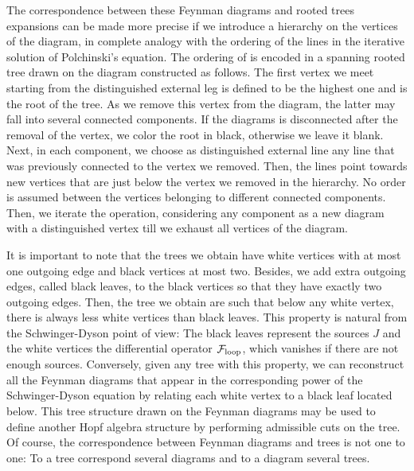 \documentclass[12pt,here,feynmf]{article}
\begin{document}
The correspondence between these Feynman diagrams and rooted trees expansions can be made more precise if we introduce a hierarchy on the vertices of the diagram, in complete analogy with the ordering of the lines in the iterative solution of Polchinski's equation.  The ordering of is encoded in a spanning rooted tree drawn on the diagram constructed as follows. The first vertex we meet starting from the distinguished external leg is defined to be the highest one and is the root of the tree.  As we remove this vertex from the diagram, the latter may fall into several connected components. If the 
diagrams is disconnected after the removal of the vertex, we color the root in black, otherwise we leave it blank. Next, in each component, we choose as distinguished external line any line that was previously connected to the vertex we removed. Then, the lines point towards new vertices that are just below the vertex we removed in the hierarchy. No order is assumed between the vertices belonging to different connected components. Then, we iterate the operation, considering any component as a new 
diagram with a distinguished vertex till we exhaust all vertices of the diagram. 

It is important to note that the trees we obtain have white vertices with at most one outgoing edge and  black vertices at most two. Besides, we add extra outgoing edges, called black leaves, to the black vertices so that they have exactly two outgoing edges. Then, the tree we obtain are such that below any white vertex, there is always less  white vertices than black leaves. This property is natural from the Schwinger-Dyson point of view:
The black leaves represent the sources $J$ and the white vertices the differential operator ${\cal F}_{\mathrm{loop}}$, which vanishes if there are not enough sources.  Conversely, given any tree with this property, we can reconstruct all the Feynman diagrams that appear in the corresponding power of the Schwinger-Dyson equation by relating each white vertex to a black leaf located below. This tree structure drawn on the Feynman diagrams may be used to define another Hopf algebra structure by performing admissible cuts on the tree. Of course, the correspondence between Feynman diagrams and trees is not one to one: To a tree correspond several diagrams and to a diagram several trees.
\end{document}

